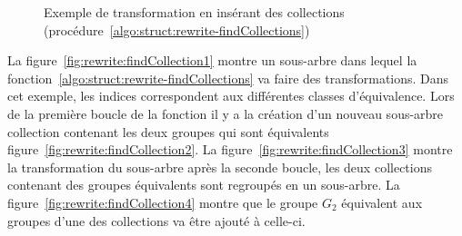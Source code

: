 \begin{figure}[htb]
    \caption[Exemple de transformation en insérant des collections]{Exemple de transformation en insérant des collections (procédure~\ref{algo:struct:rewrite-findCollections})}
    \label{fig:rewrite:findCollections}
\end{figure}

\begin{example}
    La figure~\ref{fig:rewrite:findCollection1} montre un sous-arbre dans lequel la fonction~\ref{algo:struct:rewrite-findCollections} va faire des transformations.
    Dans cet exemple, les indices correspondent aux différentes classes d'équivalence.
    Lors de la première boucle de la fonction il y a la création d'un nouveau sous-arbre collection contenant les deux groupes qui sont équivalents figure~\ref{fig:rewrite:findCollection2}.
    La figure~\ref{fig:rewrite:findCollection3} montre la transformation du sous-arbre après la seconde boucle, les deux collections contenant des groupes équivalents sont regroupés en un sous-arbre.
    La figure~\ref{fig:rewrite:findCollection4} montre que le groupe $G_2$ équivalent aux groupes d'une des collections va être ajouté à celle-ci.
\end{example} 

    
       

